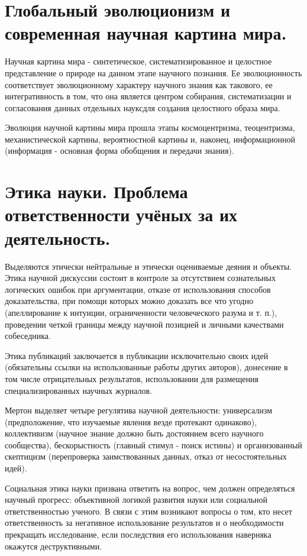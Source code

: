 \documentclass[12pt, specialist, subf, substylefile = spbu.rtx]{disser}
\begin{document}
\section{Глобальный эволюционизм и современная научная картина мира.}
Научная картина мира - синтетическое, систематизированное и целостное представление о природе на данном этапе научного познания. Ее эволюционность соответствует эволюционному характеру научного знания как такового, ее интегративность в том, что она является центром собирания, систематизации и согласования данных отдельных науксдля создания целостного образа мира.

Эволюция научной картины мира прошла этапы космоцентризма, теоцентризма, механистической картины, вероятностной картины и, наконец, информационной (информация - основная форма обобщения и передачи знания).

\section{Этика науки. Проблема ответственности учёных за их деятельность.}
Выделяются этически нейтральные и этически оцениваемые деяния и объекты.
Этика научной дискуссии состоит в контроле за отсутствием сознательных логических ошибок при аргументации, отказе от использования способов доказательства, при помощи которых можно доказать все что угодно (апеллирование к интуиции, ограниченности человеческого разума и т. п.), проведении четкой границы между научной позицией и личными качествами собеседника.

Этика публикаций заключается в публикации исключительно своих идей (обязательны ссылки на использованные работы других авторов), донесение в том числе отрицательных результатов, использовании для размещения специализированных научных журналов.

Мертон выделяет четыре регулятива научной деятельности: универсализм (предположение, что изучаемые явления везде протекают одинаково), коллективизм (научное знание должно быть достоянием всего научного сообщества), бескорыстность (главный стимул - поиск истины) и организованный скептицизм (перепроверка заимствованных данных, отказ от несостоятельных идей).

Социальная этика науки призвана ответить на вопрос, чем должен определяться научный прогресс: объективной логикой развития науки или социальной ответственностью ученого. В связи с этим возникают вопросы о том, кто несет ответственность за негативное использование результатов и о необходимости прекращать исследование, если последствия его использования наверняка окажутся деструктивными.
\end{document}
